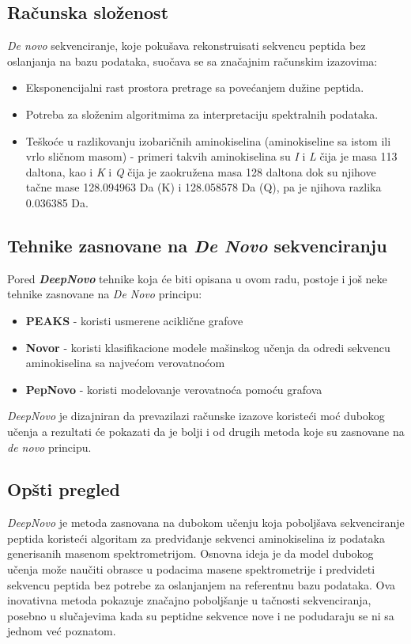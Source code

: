 \documentclass[12pt,oneside]{memoir}
\begin{document}
\subsection{Računska složenost}
\emph{De novo} sekvenciranje, koje pokušava rekonstruisati sekvencu peptida bez oslanjanja na bazu podataka, suočava se sa značajnim računskim izazovima:

\begin{itemize}
\item Eksponencijalni rast prostora pretrage sa povećanjem dužine peptida.
\item Potreba za složenim algoritmima za interpretaciju spektralnih podataka.
\item Teškoće u razlikovanju izobaričnih aminokiselina (aminokiseline sa istom ili vrlo sličnom masom) - primeri takvih aminokiselina su \textit{I} i \textit{L} čija je masa 113 daltona, kao i \textit{K} i \textit{Q} čija je zaokružena masa 128 daltona dok su njihove tačne mase 128.094963 Da (K) i 128.058578 Da (Q), pa je njihova razlika 0.036385 Da. 
\end{itemize}

\subsection{Tehnike zasnovane na \emph{De Novo} sekvenciranju}
Pored \textbf{\emph{DeepNovo}} tehnike koja će biti opisana u ovom radu, postoje i još neke tehnike zasnovane na \emph{De Novo} principu:

\begin{itemize}
\item \textbf{PEAKS} \cite{peaks} - koristi usmerene aciklične grafove
\item \textbf{Novor} \cite{novor} - koristi klasifikacione modele mašinskog učenja da odredi sekvencu aminokiselina sa najvećom verovatnoćom
\item \textbf{PepNovo} \cite{pepnovo} - koristi modelovanje verovatnoća pomoću grafova
\end{itemize}

\emph{DeepNovo} je dizajniran da prevazilazi računske izazove koristeći moć dubokog učenja a rezultati će pokazati da je bolji i od drugih metoda koje su zasnovane na \emph{de novo} principu.

\subsection{Opšti pregled}
\emph{DeepNovo} \cite{deepnovo} je metoda zasnovana na dubokom učenju koja poboljšava sekvenciranje peptida koristeći algoritam za predviđanje sekvenci aminokiselina iz podataka generisanih masenom spektrometrijom. Osnovna ideja je da model dubokog učenja može naučiti obrasce u podacima masene spektrometrije i predvideti sekvencu peptida bez potrebe za oslanjanjem na referentnu bazu podataka. Ova inovativna metoda pokazuje značajno poboljšanje u tačnosti sekvenciranja, posebno u slučajevima kada su peptidne sekvence nove i ne podudaraju se ni sa jednom već poznatom.
\end{document}
